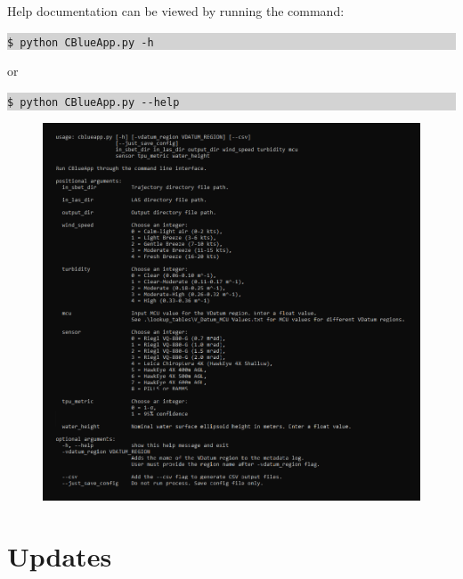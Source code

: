 \documentclass[11pt, a4paper]{article}
\begin{document}
Help documentation can be viewed by running the command: 

\vspace{1em}

\colorbox{lightgray}{\begin{minipage}{\linewidth}
    \texttt{\$ python CBlueApp.py -h}
\end{minipage}}

\vspace{1em}

or

\vspace{1em}

\colorbox{lightgray}{\begin{minipage}{\linewidth}
    \texttt{\$ python CBlueApp.py -{}-help}
\end{minipage}}

\begin{figure}[H]
    \centering
    \includegraphics[width=16cm]{figs/help_docs_command_line.png}
\end{figure}

\section{Updates}       
\label{sec:updates}    
\vspace{-.1cm}
\end{document}
